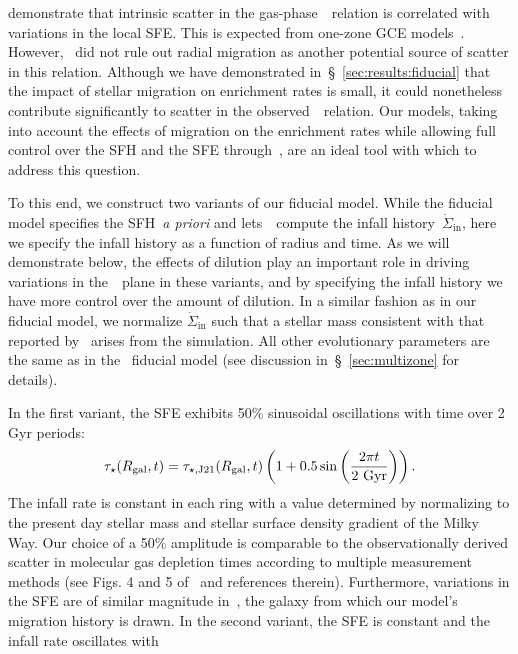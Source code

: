 \documentclass[ms.tex]{subfiles}
\begin{document}
\citet{Schaefer2020} demonstrate that intrinsic scatter in the
gas-phase~\ohno~relation is correlated with variations in the local SFE.
This is expected from one-zone GCE models~\citep[e.g.][]{Molla2006,
Vincenzo2016a}.
However,~\citet{Schaefer2020} did not rule out radial migration as another
potential source of scatter in this relation.
Although we have demonstrated in~\S~\ref{sec:results:fiducial} that the impact
of stellar migration on enrichment rates is small, it could nonetheless
contribute significantly to scatter in the observed~\ohno~relation.
Our models, taking into account the effects of migration on the
enrichment rates while allowing full control over the SFH and the SFE
through~\vice, are an ideal tool with which to address this question.
\par
To this end, we construct two variants of our fiducial model.
While the fiducial model specifies the SFH~\textit{a priori} and
lets~\vice~compute the infall history~$\dot{\Sigma}_\text{in}$, here we specify
the infall history as a function of radius and time.
As we will demonstrate below, the effects of dilution play an important role in
driving variations in the~\ohno~plane in these variants, and by specifying the
infall history we have more control over the amount of dilution.
In a similar fashion as in our fiducial model, we normalize
$\dot{\Sigma}_\text{in}$ such that a stellar mass consistent with that reported
by~\citet{Licquia2015} arises from the simulation.
All other evolutionary parameters are the same as in the~\citet{Johnson2021}
fiducial model (see discussion in~\S~\ref{sec:multizone} for details).
\par
In the first variant, the SFE exhibits 50\% sinusoidal oscillations with time
over 2 Gyr periods:
\begin{equation}
\tau_\star(R_\text{gal}, t) = \tau_{\star,\text{J21}}(R_\text{gal}, t)
\left(1 + 0.5\sin\left(\frac{2\pi t}{2~\text{Gyr}}\right)\right).
\label{eq:sfe_var}
\end{equation}
The infall rate is constant in each ring with a value determined by normalizing
to the present day stellar mass and stellar surface density gradient of the
Milky Way.
Our choice of a 50\% amplitude is comparable to the observationally derived
scatter in molecular gas depletion times according to multiple measurement
methods (see Figs. 4 and 5 of~\citealp{Tacconi2018} and references therein).
Furthermore, variations in the SFE are of similar magnitude in~\hsim, the
galaxy from which our model's migration history is drawn.
In the second variant, the SFE is constant and the infall rate oscillates with
\end{document}
